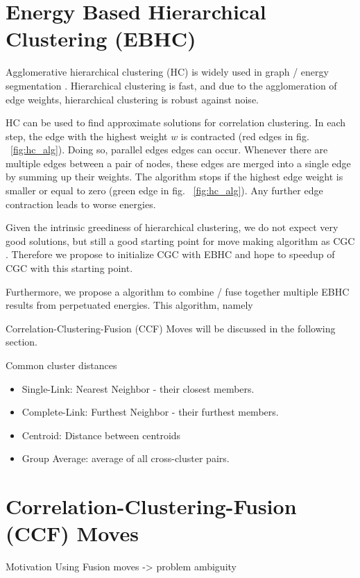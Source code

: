 \documentclass[10pt,twocolumn,letterpaper]{article}
\begin{document}
\section{Energy Based Hierarchical Clustering (EBHC)}

Agglomerative hierarchical clustering (HC) is widely used
in graph / energy segmentation
\cite{arbelaez_2006}.
Hierarchical clustering is fast, and 
due to the agglomeration of edge weights, 
hierarchical clustering is robust against noise.

HC can be used to find approximate
solutions for correlation clustering.
In each step, the edge with the highest weight $w$ is
contracted (red edges in fig. ~\ref{fig:hc_alg}).
Doing so, parallel edges edges can occur.
Whenever there are multiple edges between 
a pair of nodes, these edges are merged into a single edge
by summing up their weights.
The algorithm stops if the highest edge weight is
smaller or equal to zero  (green edge in fig. ~\ref{fig:hc_alg}). Any further edge
contraction leads to worse energies.

Given the intrinsic greediness of hierarchical clustering, 
we do not expect very good solutions, but still a good starting 
point for move making algorithm as CGC \cite{beier_2014_cvpr}.
Therefore we propose to initialize  CGC with EBHC
and hope to speedup of CGC with this starting point.

Furthermore, we propose a algorithm to combine / fuse together
multiple EBHC results from perpetuated energies.
This algorithm, namely 

 Correlation-Clustering-Fusion (CCF) Moves 
will be discussed in the following section.


Common cluster distances
\begin{itemize}
\item Single-Link: Nearest Neighbor - their closest members.
\item Complete-Link: Furthest Neighbor - their furthest members.
\item Centroid: Distance between centroids
\item Group Average: average of all cross-cluster pairs.
\end{itemize}

\section{Correlation-Clustering-Fusion (CCF) Moves}\label{sec:cc_fm}
Motivation Using Fusion moves -> problem ambiguity
\end{document}
